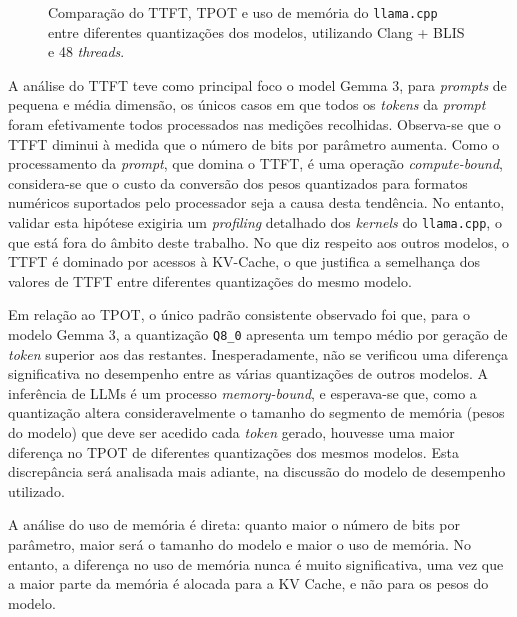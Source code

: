 \documentclass[11pt, a4paper]{article}
\begin{document}
\begin{figure}[H]
    \centering
    
    
\end{figure}
\begin{figure}[H]
    
    \vspace{-\baselineskip}
    \caption{
        \onehalfspacing
        Comparação do TTFT, TPOT e uso de memória do \texttt{llama.cpp} entre diferentes
        quantizações dos modelos, utilizando Clang + BLIS e 48 \emph{threads}.
    }
    \label{quantization-results}
\end{figure}

A análise do TTFT teve como principal foco o model Gemma 3, para \emph{prompts} de pequena e média
dimensão, os únicos casos em que todos os \emph{tokens} da \emph{prompt} foram efetivamente todos
processados nas medições recolhidas. Observa-se que o TTFT diminui à medida que o número de bits por
parâmetro aumenta. Como o processamento da \emph{prompt}, que domina o TTFT, é uma operação
\emph{compute-bound}, considera-se que o custo da conversão dos pesos quantizados para formatos
numéricos suportados pelo processador seja a causa desta tendência. No entanto, validar esta
hipótese exigiria um \emph{profiling} detalhado dos \emph{kernels} do \texttt{llama.cpp}, o que está
fora do âmbito deste trabalho. No que diz respeito aos outros modelos, o TTFT é dominado por acessos
à KV-Cache, o que justifica a semelhança dos valores de TTFT entre diferentes quantizações do mesmo
modelo.

Em relação ao TPOT, o único padrão consistente observado foi que, para o modelo Gemma 3, a
quantização \texttt{Q8\_0} apresenta um tempo médio por geração de \emph{token} superior aos das
restantes. Inesperadamente, não se verificou uma diferença significativa no desempenho entre as
várias quantizações de outros modelos. A inferência de LLMs é um processo \emph{memory-bound}, e
esperava-se que, como a quantização altera consideravelmente o tamanho do segmento de memória
(pesos do modelo) que deve ser acedido cada \emph{token} gerado, houvesse uma maior diferença no
TPOT de diferentes quantizações dos mesmos modelos. Esta discrepância será analisada mais adiante,
na discussão do modelo de desempenho utilizado.

A análise do uso de memória é direta: quanto maior o número de bits por parâmetro, maior será o
tamanho do modelo e maior o uso de memória. No entanto, a diferença no uso de memória nunca é muito
significativa, uma vez que a maior parte da memória é alocada para a KV Cache, e não para os pesos
do modelo.
\end{document}
